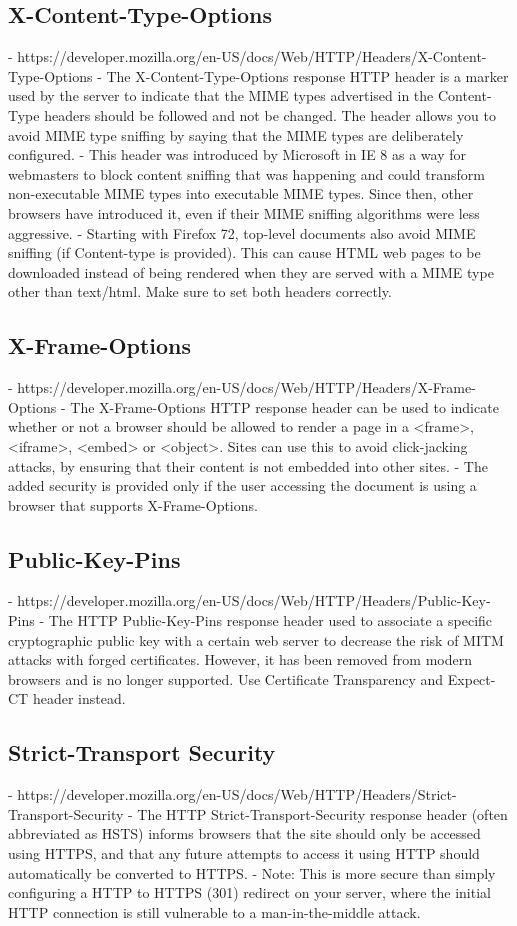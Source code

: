 \documentclass{mscreport}
\begin{document}
\subsection{X-Content-Type-Options}
- https://developer.mozilla.org/en-US/docs/Web/HTTP/Headers/X-Content-Type-Options
- The X-Content-Type-Options response HTTP header is a marker used by the server to indicate that the MIME types advertised in the Content-Type headers should be followed and not be changed. The header allows you to avoid MIME type sniffing by saying that the MIME types are deliberately configured.
- This header was introduced by Microsoft in IE 8 as a way for webmasters to block content sniffing that was happening and could transform non-executable MIME types into executable MIME types. Since then, other browsers have introduced it, even if their MIME sniffing algorithms were less aggressive.
- Starting with Firefox 72, top-level documents also avoid MIME sniffing (if Content-type is provided). This can cause HTML web pages to be downloaded instead of being rendered when they are served with a MIME type other than text/html. Make sure to set both headers correctly.

\subsection{X-Frame-Options}
- https://developer.mozilla.org/en-US/docs/Web/HTTP/Headers/X-Frame-Options
- The X-Frame-Options HTTP response header can be used to indicate whether or not a browser should be allowed to render a page in a <frame>, <iframe>, <embed> or <object>. Sites can use this to avoid click-jacking attacks, by ensuring that their content is not embedded into other sites.
- The added security is provided only if the user accessing the document is using a browser that supports X-Frame-Options.

\subsection{Public-Key-Pins}
- https://developer.mozilla.org/en-US/docs/Web/HTTP/Headers/Public-Key-Pins
- The HTTP Public-Key-Pins response header used to associate a specific cryptographic public key with a certain web server to decrease the risk of MITM attacks with forged certificates. However, it has been removed from modern browsers and is no longer supported. Use Certificate Transparency and Expect-CT header instead.

\subsection{Strict-Transport Security}
- https://developer.mozilla.org/en-US/docs/Web/HTTP/Headers/Strict-Transport-Security
- The HTTP Strict-Transport-Security response header (often abbreviated as HSTS) informs browsers that the site should only be accessed using HTTPS, and that any future attempts to access it using HTTP should automatically be converted to HTTPS.
- Note: This is more secure than simply configuring a HTTP to HTTPS (301) redirect on your server, where the initial HTTP connection is still vulnerable to a man-in-the-middle attack.
\end{document}

